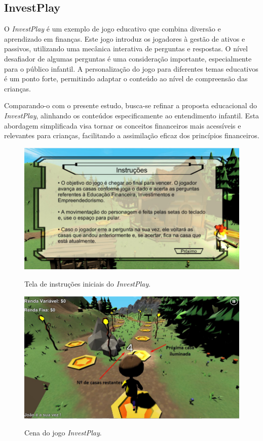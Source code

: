 \newpage

\subsection{InvestPlay}
O \textit{InvestPlay} \cite{santos2020investplay} é um exemplo de jogo educativo que combina diversão e aprendizado em finanças. Este jogo introduz os jogadores à gestão de ativos e passivos, utilizando uma mecânica interativa de perguntas e respostas. O nível desafiador de algumas perguntas é uma consideração importante, especialmente para o público infantil. A personalização do jogo para diferentes temas educativos é um ponto forte, permitindo adaptar o conteúdo ao nível de compreensão das crianças.

Comparando-o com o presente estudo, busca-se refinar a proposta educacional do \textit{InvestPlay}, alinhando os conteúdos especificamente ao entendimento infantil. Esta abordagem simplificada visa tornar os conceitos financeiros mais acessíveis e relevantes para crianças, facilitando a assimilação eficaz dos princípios financeiros.

\begin{figure}[ht]
	\centering
	\caption{Tela de instruções iniciais do \textit{InvestPlay}.}
	\includegraphics[scale=0.6]{Textuais/Pictures/invest-play-1.png}
	\label{fig:invest-play-1}
\end{figure}

\begin{figure}[ht]
	\centering
	\caption{Cena do jogo \textit{InvestPlay}.}
	\includegraphics[scale=0.6]{Textuais/Pictures/invest-play-2.png}
	\label{fig:invest-play-2}
\end{figure}

